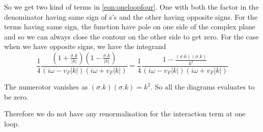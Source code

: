 \documentclass[a4paper,crop=false]{standalone}
\begin{document}
        So we get two kind of terms in \ref{eqn:oneloopfour}. One with both the factor in the denominator having same sign of s's and the other having opposite signs. For the terms having same sign, the function have pole on one side of the complex plane and so  we can always close the contour on the other side to get zero. For the case when we have opposite signs, we have the integrand
        \begin{equation}
            \frac{1}{4}\frac{(1+\frac{\sigma . k}{|k|})(1 - \frac{\sigma . k}{|k|})}{(i\omega - v_F|k|)(i\omega + v_F|k|)} = \frac{1}{4}\frac{1 - \frac{(\sigma . k)(\sigma . k)}{k^2}}{(i\omega - v_F|k|)(i\omega + v_F|k|)}
        \end{equation}

        The numerotor vanishes as $(\sigma . k)(\sigma . k) = k^2$. So all the diagrams evaluates to be zero.

        Therefore we do not have any renormalisation for the interaction term at one loop.
\end{document}
